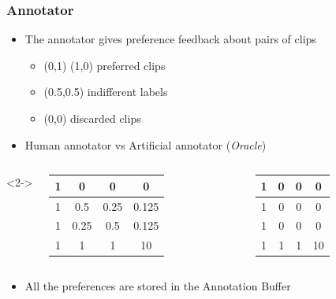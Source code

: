 \begin{frame}
\frametitle{Annotator}
		\begin{itemize}
		\item The annotator gives preference feedback about pairs of clips
		\vspace{0.2cm}
		\begin{itemize}
			\item (0,1) (1,0) preferred clips
			\item (0.5,0.5) indifferent labels
			\item (0,0) discarded clips
		\end{itemize}
		
	\vspace{0.3cm}
	
		\item<2-> Human annotator vs Artificial annotator (\textit{Oracle})
		
	\end{itemize}
	\begin{columns}<2->
		\begin{column}{0.5\textwidth}
			\centering
			\footnotesize{
			\begin{tabular}{|c|c|c|c|}
				\hline
				1 & 0    & 0    & 0     \\ \hline
				1 & 0.5  & 0.25 & 0.125 \\ \hline
				1 & 0.25 & 0.5  & 0.125 \\ \hline
				1 & 1    & 1    & 10    \\ \hline
			\end{tabular}
		}
		\end{column}
		
		\begin{column}{0.5\textwidth}
			\centering
			\footnotesize{
			\begin{tabular}{|c|c|c|c|}
				\hline
				1 & 0 & 0 & 0  \\ \hline
				1 & 0 & 0 & 0  \\ \hline
				1 & 0 & 0 & 0  \\ \hline
				1 & 1 & 1 & 10 \\ \hline
			\end{tabular}
		}
		\end{column}
	\end{columns}
	
	\vspace{0.3cm}
	
	\begin{itemize}
		\item<3-> All the preferences are stored in the Annotation Buffer
	\end{itemize}
	
\end{frame}

